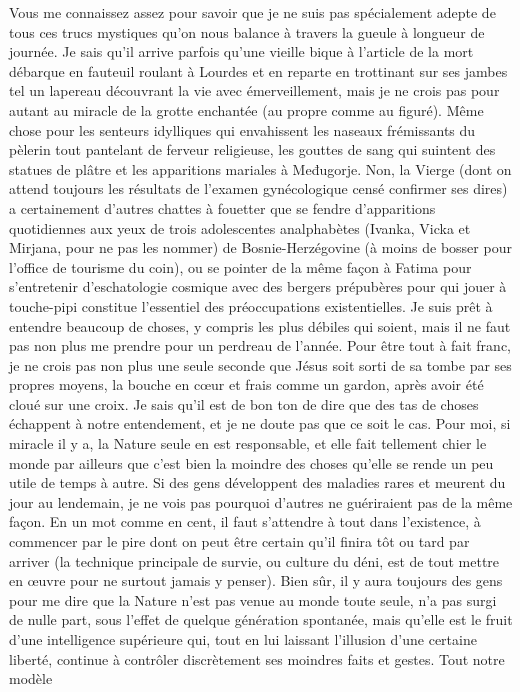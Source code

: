 %
%
Vous me connaissez assez pour savoir que je ne suis pas spécialement adepte de tous ces trucs mystiques qu’on nous balance à travers la gueule à longueur de journée. Je sais qu’il arrive parfois qu’une vieille bique à l’article de la mort débarque en fauteuil roulant à Lourdes et en reparte en trottinant sur ses jambes tel un lapereau découvrant la vie avec émerveillement, mais je ne crois pas pour autant au miracle de la grotte enchantée (au propre comme au figuré). Même chose pour les senteurs idylliques qui envahissent les naseaux frémissants du pèlerin tout pantelant de ferveur religieuse, les gouttes de sang qui suintent des statues de plâtre et les apparitions mariales à Međugorje. Non, la Vierge (dont on attend toujours les résultats de l’examen gynécologique censé confirmer ses dires) a certainement d’autres chattes à fouetter que se fendre d’apparitions quotidiennes aux yeux de trois adolescentes analphabètes (Ivanka, Vicka et Mirjana, pour ne pas les nommer) de Bosnie-Herzégovine (à moins de bosser pour l’office de tourisme du coin), ou se pointer de la même façon à Fatima pour s’entretenir d’eschatologie cosmique avec des bergers prépubères pour qui jouer à touche-pipi constitue l’essentiel des préoccupations existentielles. Je suis prêt à entendre beaucoup de choses, y compris les plus débiles qui soient, mais il ne faut pas non plus me prendre pour un perdreau de l’année. Pour être tout à fait franc, je ne crois pas non plus une seule seconde que Jésus soit sorti de sa tombe par ses propres moyens, la bouche en cœur et frais comme un gardon, après avoir été cloué sur une croix. Je sais qu’il est de bon ton de dire que des tas de choses échappent à notre entendement, et je ne doute pas que ce soit le cas. Pour moi, si miracle il y a, la Nature seule en est responsable, et elle fait tellement chier le monde par ailleurs que c’est bien la moindre des choses qu’elle se rende un peu utile de temps à autre. Si des gens développent des maladies rares et meurent du jour au lendemain, je ne vois pas pourquoi d’autres ne guériraient pas de la même façon. En un mot comme en cent, il faut s’attendre à tout dans l’existence, à commencer par le pire dont on peut être certain qu’il finira tôt ou tard par arriver (la technique principale de survie, ou culture du déni, est de tout mettre en œuvre pour ne surtout jamais y penser). Bien sûr, il y aura toujours des gens pour me dire que la Nature n’est pas venue au monde toute seule, n’a pas surgi de nulle part, sous l’effet de quelque génération spontanée, mais qu’elle est le fruit d’une intelligence supérieure qui, tout en lui laissant l’illusion d’une certaine liberté, continue à contrôler discrètement ses moindres faits et gestes. Tout notre modèle 